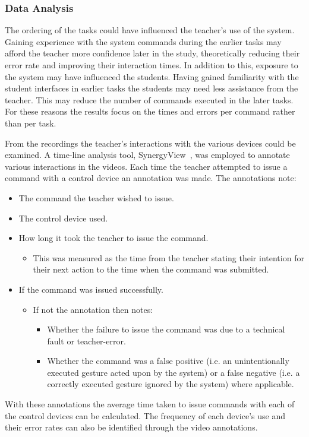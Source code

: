\documentclass[link]{IWCOMP}
\begin{document}
\subsubsection{Data Analysis}
\label{subsec:studyAnalysis}


The ordering of the tasks could have influenced the teacher's use of the system.
Gaining experience with the system commands during the earlier tasks may afford the teacher more confidence later in the study, theoretically reducing their error rate and improving their interaction times.
In addition to this, exposure to the system may have influenced the students.
Having gained familiarity with the student interfaces in earlier tasks the students may need less assistance from the teacher.
This may reduce the number of commands executed in the later tasks.
For these reasons the results focus on the times and errors per command rather than per task.

From the recordings the teacher's interactions with the various devices could be examined.
A time-line analysis tool, SynergyView~\cite{Kyaw2011}, was employed to annotate various interactions in the videos.
Each time the teacher attempted to issue a command with a control device an annotation was made.
The annotations note:
\begin{itemize}
\item The command the teacher wished to issue.
\item The control device used.
\item How long it took the teacher to issue the command.
\begin{itemize}
\item This was measured as the time from the teacher stating their intention for their next action to the time when the command was submitted.
\end{itemize}
\item If the command was issued successfully.
\begin{itemize}
\item If not the annotation then notes:
\begin{itemize}
\item Whether the failure to issue the command was due to a technical fault or teacher-error.
\item Whether the command was a false positive (i.e. an unintentionally executed gesture acted upon by the system) or a false negative (i.e. a correctly executed gesture ignored by the system) where applicable.\\
\end{itemize}
\end{itemize}
\end{itemize}
With these annotations the average time taken to issue commands with each of the control devices can be calculated.
The frequency of each device's use and their error rates can also be identified through the video annotations.
\end{document}
